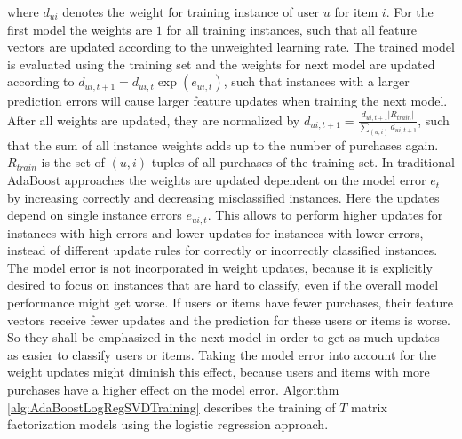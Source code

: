 \documentclass[10pt]{reportMaster}
\begin{document}
where $d_{ui}$ denotes the weight for training instance of user $u$ for item $i$.
For the first model the weights are $1$ for all training instances, such that all feature vectors are updated according to the unweighted learning rate.
The trained model is evaluated using the training set and the weights for next model are updated according to $d_{ui,t+1} = d_{ui,t} \exp(e_{ui,t})$, such that instances with a larger prediction errors will cause larger feature updates when training the next model.
After all weights are updated, they are normalized by $d_{ui,t+1} = \frac{d_{ui,t+1} |R_{train}|}{\sum_{(u,i)}{d_{ui,t+1}}}$, such that the sum of all instance weights adds up to the number of purchases again.
$R_{train}$ is the set of $(u,i)$-tuples of all purchases of the training set.
In traditional AdaBoost approaches the weights are updated dependent on the model error $e_t$ by increasing correctly and decreasing misclassified instances.
Here the updates depend on single instance errors $e_{ui,t}$.
This allows to perform higher updates for instances with high errors and lower updates for instances with lower errors, instead of different update rules for correctly or incorrectly classified instances. 
The model error is not incorporated in weight updates, because it is explicitly desired to focus on instances that are hard to classify, even if the overall model performance might get worse.
If users or items have fewer purchases, their feature vectors receive fewer updates and the prediction for these users or items is worse.
So they shall be emphasized in the next model in order to get as much updates as easier to classify users or items.
Taking the model error into account for the weight updates might diminish this effect, because users and items with more purchases have a higher effect on the model error.
Algorithm \ref{alg:AdaBoostLogRegSVDTraining} describes the training of $T$ matrix factorization models using the logistic regression approach.
\end{document}
